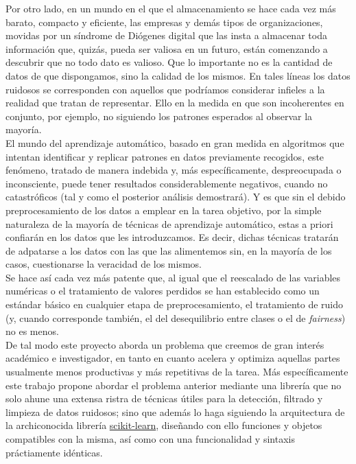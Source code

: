\documentclass[print, color]{ugrTFG}
\begin{document}
Por otro lado, en un mundo en el que el almacenamiento se hace cada vez más barato, compacto y eficiente, las empresas y demás tipos de organizaciones, movidas por un síndrome de Diógenes digital que las insta a almacenar toda información que, quizás, pueda ser valiosa en un futuro, están comenzando a descubrir que no todo dato es valioso. Que lo importante no es la cantidad de datos de que dispongamos, sino la calidad de los mismos. En tales líneas los datos ruidosos se corresponden con aquellos que podríamos considerar infieles a la realidad que tratan de representar. Ello en la medida en que son incoherentes en conjunto, por ejemplo, no siguiendo los patrones esperados al observar la mayoría.\\

El mundo del aprendizaje automático, basado en gran medida en algoritmos que intentan identificar y replicar patrones en datos previamente recogidos, este fenómeno, tratado de manera indebida y, más específicamente, despreocupada o inconsciente, puede tener resultados considerablemente negativos, cuando no catastróficos  (tal y como el posterior análisis demostrará). Y es que sin el debido preprocesamiento de los datos a emplear en la tarea objetivo, por la simple naturaleza de la mayoría de técnicas de aprendizaje automático, estas a priori confiarán en los datos que les introduzcamos. Es decir, dichas técnicas tratarán de adpatarse a los datos con las que las alimentemos sin, en la mayoría de los casos, cuestionarse la veracidad de los mismos.\\
Se hace así cada vez más patente que, al igual que el reescalado de las variables numéricas o el tratamiento de valores perdidos se han establecido como un estándar básico en cualquier etapa de preprocesamiento, el tratamiento de ruido (y, cuando corresponde también, el del desequilibrio entre clases o el de \textit{fairness}) no es menos.\\



De tal modo este proyecto aborda un problema que creemos de gran interés académico e investigador, en tanto en cuanto acelera y optimiza aquellas partes usualmente menos productivas y más repetitivas de la tarea. Más específicamente este trabajo propone abordar el problema anterior mediante una librería que no solo ahune una extensa ristra de técnicas útiles para la detección, filtrado y limpieza de datos ruidosos; sino que además lo haga siguiendo la arquitectura de la archiconocida librería \href{https://scikit-learn.org/stable/index.html}{scikit-learn}, diseñando con ello funciones y objetos compatibles con la misma, así como con una funcionalidad y sintaxis práctiamente idénticas.\\
\newline
\end{document}
